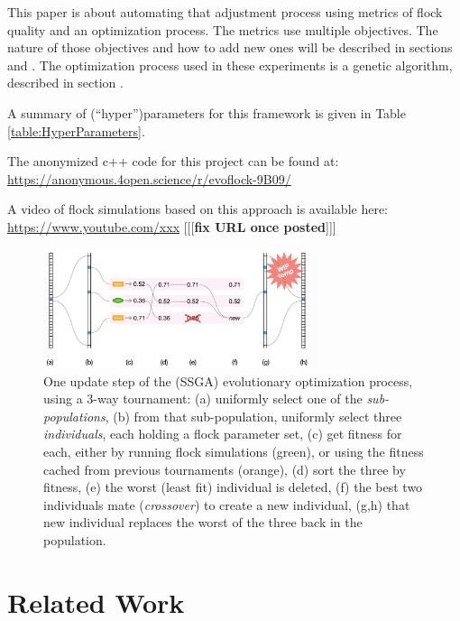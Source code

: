 \documentclass[letterpaper]{article}
\begin{document}
This paper is about automating that adjustment process using metrics of flock quality and an optimization process. The metrics use multiple objectives. The nature of those objectives and how to add new ones will be described in sections  and . The optimization process used in these experiments is a genetic algorithm, described in section .

A summary of (``hyper'')parameters for this framework is given in Table \ref{table:HyperParameters}.

The anonymized c++ code for this project can be found at:
\scriptsize
\url{https://anonymous.4open.science/r/evoflock-9B09/}
\normalsize

A video of flock simulations based on this approach is available here:
\scriptsize
\url{https://www.youtube.com/xxx}
\normalsize
[[[\textbf{fix URL once posted}]]]


\begin{figure}[t]
    \centering
    \includegraphics[width=0.7\textwidth]{images/temp_evo_update.png}
    \caption{One update step of the (SSGA) evolutionary optimization process, using a 3-way tournament: (a) uniformly select one of the \textit{sub-populations}, (b) from that sub-population, uniformly select three \textit{individuals}, each holding a flock parameter set, (c) get fitness for each, either by running flock simulations (green), or using the fitness cached from previous tournaments (orange), (d) sort the three by fitness, (e) the worst (least fit) individual is deleted, (f) the best two individuals mate (\textit{crossover}) to create a new individual, (g,h) that new individual replaces the worst of the three back in the population.}
    \label{fig:temp_evo_update}
\end{figure}


\section{Related Work}
\label{sec:related}
\end{document}
